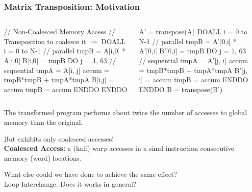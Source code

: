 \documentclass{beamer}
\renewcommand{\emph}[1]{\textcolor{structure}{#1}}
\newcommand{\emp}[1]{\textcolor{DikuRed}{ #1}}
\newcommand{\mymath}[1]{$ #1 $}
\begin{document}
\begin{frame}[fragile]
	\tableofcontents[currentsection]
\end{frame}

\begin{frame}[fragile,t]
  \frametitle{Matrix Transposition: Motivation} 

\begin{columns}
\begin{colorcode}[fontsize=\scriptsize]
// Non-Coalesced Memory Access
// Transposition to coalesce it \mymath{\Rightarrow}
DOALL i = 0 to N-1  // \emph{parallel}
  tmpB = A[i,0] * A[i,0]
  B[i,0] = tmpB
  DO j = 1, 63 // \emp{sequential}
    tmpA   = A[i, j]
    accum  = tmpB*tmpB + tmpA*tmpA
    B[i,j] = accum
    tmpB   = accum
  ENDDO
ENDDO
\end{colorcode}
\begin{colorcode}[fontsize=\scriptsize]
A' = transpose(A)
DOALL i = 0 to N-1  // \emph{parallel}
  tmpB = A'[0,i] * A'[0,i]
  B'[0,i] = tmpB
  DO j = 1, 63 // \emp{sequential}
    tmpA   = A'[j, i]
    accum  = tmpB*tmpB + tmpA*tmpA
    B'[j, i] = accum
    tmpB     = accum
  ENDDO
ENDDO
B = transpose(B')
\end{colorcode}
\end{columns}
\bigskip

\emp{The transformed program performs about twice the number of
accesses to global memory than the original.}  
\medskip

\emph{But exhibits only coalesced accesses!}\\
\textbf{Coalesced Access:} a (half) warp accesses in a {\sc simd} instruction consecutive memory (word) locations. 
\medskip

\alert{What else could we have done to achieve the same effect?}\\\pause
\emph{Loop Interchange. Does it works in general?}
\end{frame}
\end{document}
